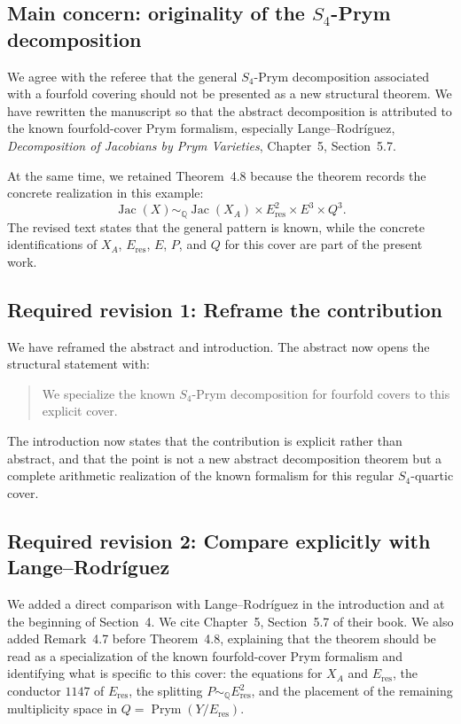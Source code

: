 \documentclass[11pt,letterpaper]{article}
\newcommand{\QQ}{\mathbb{Q}}
\newcommand{\Jac}{\operatorname{Jac}}
\newcommand{\Prym}{\operatorname{Prym}}
\begin{document}
\subsection*{Main concern: originality of the \(S_4\)-Prym decomposition}

We agree with the referee that the general \(S_4\)-Prym decomposition associated with a fourfold covering should not be presented as a new structural theorem. We have rewritten the manuscript so that the abstract decomposition is attributed to the known fourfold-cover Prym formalism, especially Lange--Rodr{\'i}guez, \emph{Decomposition of Jacobians by Prym Varieties}, Chapter~5, Section~5.7.

At the same time, we retained Theorem~4.8 because the theorem records the concrete realization in this example:
\[
\Jac(X)\sim_{\QQ}\Jac(X_A)\times E_{\mathrm{res}}^2\times E^3\times Q^3.
\]
The revised text states that the general pattern is known, while the concrete identifications of \(X_A\), \(E_{\mathrm{res}}\), \(E\), \(P\), and \(Q\) for this cover are part of the present work.

\subsection*{Required revision 1: Reframe the contribution}

We have reframed the abstract and introduction. The abstract now opens the structural statement with:
\begin{quote}
We specialize the known \(S_4\)-Prym decomposition for fourfold covers to this explicit cover.
\end{quote}
The introduction now states that the contribution is explicit rather than abstract, and that the point is not a new abstract decomposition theorem but a complete arithmetic realization of the known formalism for this regular \(S_4\)-quartic cover.

\subsection*{Required revision 2: Compare explicitly with Lange--Rodr{\'i}guez}

We added a direct comparison with Lange--Rodr{\'i}guez in the introduction and at the beginning of Section~4. We cite Chapter~5, Section~5.7 of their book. We also added Remark~4.7 before Theorem~4.8, explaining that the theorem should be read as a specialization of the known fourfold-cover Prym formalism and identifying what is specific to this cover: the equations for \(X_A\) and \(E_{\mathrm{res}}\), the conductor \(1147\) of \(E_{\mathrm{res}}\), the splitting \(P\sim_{\QQ}E_{\mathrm{res}}^2\), and the placement of the remaining multiplicity space in \(Q=\Prym(Y/E_{\mathrm{res}})\).
\end{document}

